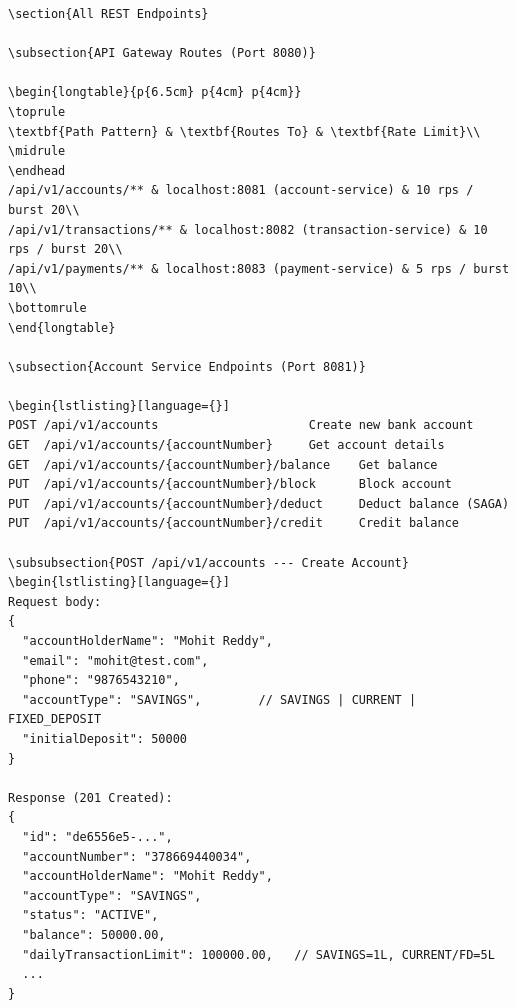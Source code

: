 \documentclass[12pt,a4paper]{article}
\begin{document}
\begin{lstlisting}[language={}]
\section{All REST Endpoints}

\subsection{API Gateway Routes (Port 8080)}

\begin{longtable}{p{6.5cm} p{4cm} p{4cm}}
\toprule
\textbf{Path Pattern} & \textbf{Routes To} & \textbf{Rate Limit}\\
\midrule
\endhead
/api/v1/accounts/** & localhost:8081 (account-service) & 10 rps / burst 20\\
/api/v1/transactions/** & localhost:8082 (transaction-service) & 10 rps / burst 20\\
/api/v1/payments/** & localhost:8083 (payment-service) & 5 rps / burst 10\\
\bottomrule
\end{longtable}

\subsection{Account Service Endpoints (Port 8081)}

\begin{lstlisting}[language={}]
POST /api/v1/accounts                     Create new bank account
GET  /api/v1/accounts/{accountNumber}     Get account details
GET  /api/v1/accounts/{accountNumber}/balance    Get balance
PUT  /api/v1/accounts/{accountNumber}/block      Block account
PUT  /api/v1/accounts/{accountNumber}/deduct     Deduct balance (SAGA)
PUT  /api/v1/accounts/{accountNumber}/credit     Credit balance

\subsubsection{POST /api/v1/accounts --- Create Account}
\begin{lstlisting}[language={}]
Request body:
{
  "accountHolderName": "Mohit Reddy",
  "email": "mohit@test.com",
  "phone": "9876543210",
  "accountType": "SAVINGS",        // SAVINGS | CURRENT | FIXED_DEPOSIT
  "initialDeposit": 50000
}

Response (201 Created):
{
  "id": "de6556e5-...",
  "accountNumber": "378669440034",
  "accountHolderName": "Mohit Reddy",
  "accountType": "SAVINGS",
  "status": "ACTIVE",
  "balance": 50000.00,
  "dailyTransactionLimit": 100000.00,   // SAVINGS=1L, CURRENT/FD=5L
  ...
}


\end{lstlisting}
\end{document}
